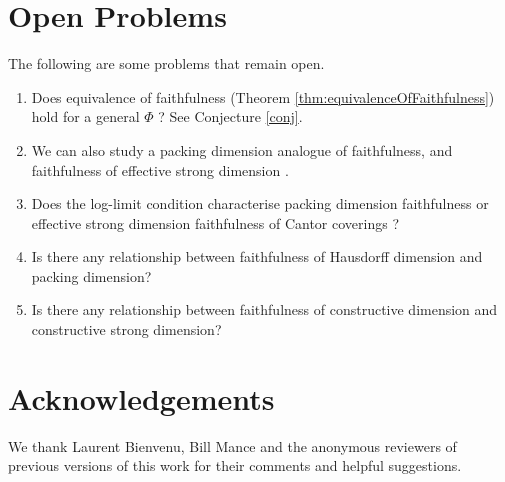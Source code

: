\documentclass[11pt]{article}
\begin{document}
\section{Open Problems} \label{sec:Conclusion}

The following are some problems that remain open.

\begin{enumerate}
	\item Does equivalence of faithfulness (Theorem \ref{thm:equivalenceOfFaithfulness}) hold for a general $\Phi$ ?  See Conjecture \ref{conj}.
	
	\item[] We can also study a packing dimension analogue of faithfulness, and faithfulness of effective strong dimension \cite{strongdim}.   
	
	\item Does the log-limit condition characterise packing dimension faithfulness or effective strong dimension faithfulness of Cantor coverings ?
	
	\item Is there any relationship between faithfulness of Hausdorff dimension and packing dimension?
	
	\item Is there any relationship between faithfulness of constructive dimension and constructive strong dimension? 
\end{enumerate}

\section*{Acknowledgements}
We thank Laurent Bienvenu, Bill Mance and the anonymous reviewers of previous versions of this work for their comments and helpful suggestions.


\end{document}
